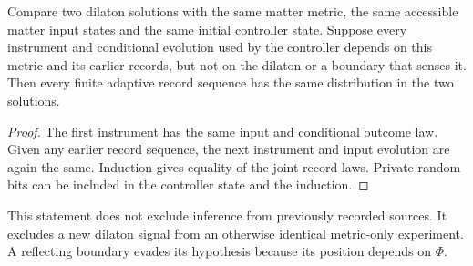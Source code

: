 \begin{proposition}\label{prop:blind-readback}
Compare two dilaton solutions with the same matter metric, the same accessible
matter input states and the same initial controller state. Suppose every
instrument and conditional evolution used by the controller depends on this
metric and its earlier records, but not on the dilaton or a boundary that senses
it. Then every finite adaptive record sequence has the same distribution in the
two solutions.
\end{proposition}
\begin{proof}
The first instrument has the same input and conditional outcome law. Given
any earlier record sequence, the next instrument and input evolution are again
the same. Induction gives equality of the joint record laws. Private random bits
can be included in the controller state and the induction.
\end{proof}
This statement does not exclude inference from previously recorded sources.
It excludes a new dilaton signal from an otherwise identical metric-only
experiment. A reflecting boundary evades its hypothesis because its position
depends on $\Phi$.

